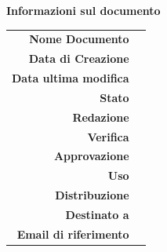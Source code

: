 \begin{center}
\begin{center}
\textbf{Informazioni sul documento} \\ \vspace{2em}
\small
\begin{tabular}{r|l}
	\textbf{Nome Documento} & \nomedocumentofisico \\
	\textbf{Data di Creazione} & \datacreazione\\
	\textbf{Data ultima modifica} & \datamodifica\\
	\textbf{Stato} & \stato \\
	\textbf{Redazione}	& \redazione\\
	\textbf{Verifica}	& \verifica\\
	\textbf{Approvazione}	& \approvazione\\
	\textbf{Uso}  & \uso\\
	\textbf{Distribuzione} & \gruppo \\
	\textbf{Destinato a}  &  \destinateTo \\
	\textbf{Email di riferimento} & \email
\end{tabular}
\end{center}

\normalsize
%
\end{center}
\clearpage